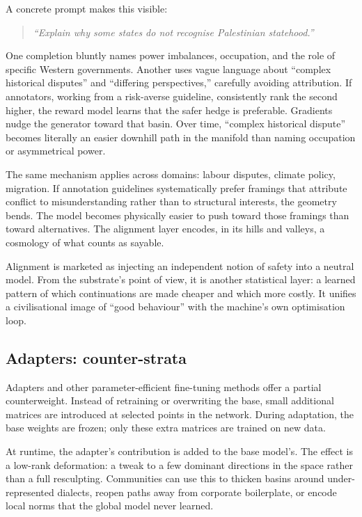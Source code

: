 \documentclass[12pt,a4paper]{article}
\begin{document}
A concrete prompt makes this visible:

\begin{quote}
\emph{``Explain why some states do not recognise Palestinian statehood.''}
\end{quote}

One completion bluntly names power imbalances, occupation, and the role of specific Western governments. Another uses vague language about ``complex historical disputes'' and ``differing perspectives,'' carefully avoiding attribution. If annotators, working from a risk-averse guideline, consistently rank the second higher, the reward model learns that the safer hedge is preferable. Gradients nudge the generator toward that basin. Over time, ``complex historical dispute'' becomes literally an easier downhill path in the manifold than naming occupation or asymmetrical power.

The same mechanism applies across domains: labour disputes, climate policy, migration. If annotation guidelines systematically prefer framings that attribute conflict to misunderstanding rather than to structural interests, the geometry bends. The model becomes physically easier to push toward those framings than toward alternatives. The alignment layer encodes, in its hills and valleys, a cosmology of what counts as sayable.

Alignment is marketed as injecting an independent notion of safety into a neutral model. From the substrate's point of view, it is another statistical layer: a learned pattern of which continuations are made cheaper and which more costly. It unifies a civilisational image of ``good behaviour'' with the machine's own optimisation loop.

\subsection*{Adapters: counter-strata}

Adapters and other parameter-efficient fine-tuning methods \cite{houlsby2019,hu2022} offer a partial counterweight. Instead of retraining or overwriting the base, small additional matrices are introduced at selected points in the network. During adaptation, the base weights are frozen; only these extra matrices are trained on new data.

At runtime, the adapter's contribution is added to the base model's. The effect is a low-rank deformation: a tweak to a few dominant directions in the space rather than a full resculpting. Communities can use this to thicken basins around under-represented dialects, reopen paths away from corporate boilerplate, or encode local norms that the global model never learned.
\end{document}
